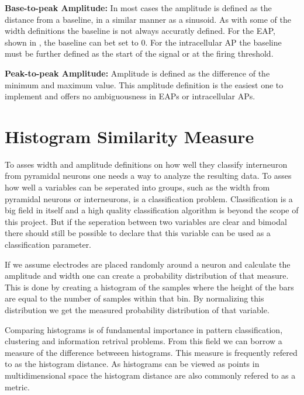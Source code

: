 \documentclass[altfont, fleqn]{uiophd}
\renewcommand{\cref}[1]{{\color{viridis_03}\mycref{#1}}}
\begin{document}
\noindent 
{\bf Base-to-peak Amplitude:} 
In most cases the amplitude is defined as the distance from a baseline,
in a similar manner as a sinusoid.
As with some of the width definitions the baseline is not always
accuratly defined. 
For the EAP, shown in \cref{fig:3_ap_eap}, the baseline can
bet set to 0. 
For the intracellular AP
the baseline must be further defined as the start of the
signal or at the firing threshold. 
\newline

\noindent 
{\bf Peak-to-peak Amplitude:} 
Amplitude is defined as the difference of 
the minimum and maximum value. 
This amplitude definition is the easiest one to implement and
offers no ambiguousness in EAPs or intracellular APs. 


\newpage
\section{Histogram Similarity Measure}
\label{sec:similarity_measure}
To asses width and amplitude definitions on how well they 
classify interneuron from pyramidal neurons
one needs a way to analyze the resulting data. 
To asses how well a variables can be seperated into groups,
such as the width from pyramidal neurons or 
interneurons,
is a classification problem. 
Classification is a big field in itself and 
a high quality classification algorithm is beyond the scope of this project. 
But if the seperation between two variables are clear and bimodal
there should still be possible to declare that this variable can
be used as a classification parameter. 

If we assume electrodes are placed randomly around a neuron and calculate
the amplitude and width one can create a probability distribution
of that measure. 
This is done by creating a histogram of the samples 
where the height of the bars are equal to the number of samples within 
that bin. 
By normalizing this distribution we get the measured probability distribution
of that variable. 

Comparing histograms is of fundamental importance in pattern classification, 
clustering and information retrival problems. 
From this field we can borrow a
measure of the difference betweeen histograms. 
This measure is frequently refered to as the histogram distance. 
As histograms can be viewed as points in multidimensional space 
the histogram distance are also commonly refered to as a metric. 
\end{document}
